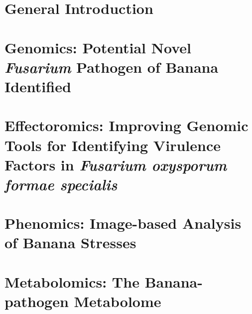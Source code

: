 \documentclass[11pt, a4paper]{report}  %
\begin{document}
\clearpage

\setcounter{secnumdepth}{2}

      
\renewcommand{\arraystretch}{1.5} %

    
\chapter{General Introduction}\label{Chap1}
    
    
\chapter{Genomics: Potential Novel \textit{Fusarium} Pathogen of Banana Identified}\label{Chap2}
    
    
\chapter{Effectoromics: Improving Genomic Tools for Identifying Virulence Factors in   \textit{Fusarium oxysporum formae specialis}}\label{Chap3}
%     
    
 \chapter{Phenomics: Image-based Analysis of Banana Stresses}\label{Chap4}
%     
    
  \chapter{Metabolomics: The Banana-pathogen Metabolome}\label{Chap5}
%     


\end{document}
